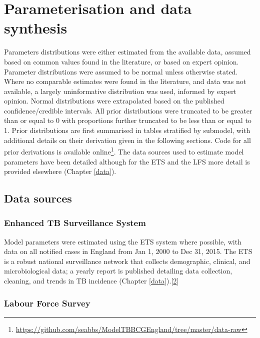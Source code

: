 \documentclass[11pt,twoside]{bristolthesis}
\begin{document}
  \hypertarget{parameterisation-and-data-synthesis}{%
  \section{Parameterisation and data synthesis}\label{parameterisation-and-data-synthesis}}
  
  Parameters distributions were either estimated from the available data, assumed based on common values found in the literature, or based on expert opinion. Parameter distributions were assumed to be normal unless otherwise stated. Where no comparable estimates were found in the literature, and data was not available, a largely uninformative distribution was used, informed by expert opinion. Normal distributions were extrapolated based on the published confidence/credible intervals. All prior distributions were truncated to be greater than or equal to 0 with proportions further truncated to be less than or equal to 1. Prior distributions are first summarised in tables stratified by submodel, with additional details on their derivation given in the following sections. Code for all prior derivations is available online\footnote{\url{https://github.com/seabbs/ModelTBBCGEngland/tree/master/data-raw}}. The data sources used to estimate model parameters have been detailed although for the ETS and the LFS more detail is provided elsewhere (Chapter \ref{data}).
  
  \hypertarget{data-sources-1}{%
  \subsection{Data sources}\label{data-sources-1}}
  
  \hypertarget{enhanced-tb-surveillance-system}{%
  \subsubsection{Enhanced TB Surveillance System}\label{enhanced-tb-surveillance-system}}
  
  Model parameters were estimated using the ETS system where possible, with data on all notified cases in England from Jan 1, 2000 to Dec 31, 2015. The ETS is a robust national surveillance network that collects demographic, clinical, and microbiological data; a yearly report is published detailing data collection, cleaning, and trends in TB incidence (Chapter \ref{data}).{[}\protect\hyperlink{ref-PHE2017}{2}{]}
  
  \hypertarget{labour-force-survey}{%
  \subsubsection{Labour Force Survey}\label{labour-force-survey}}
  
\end{document}
